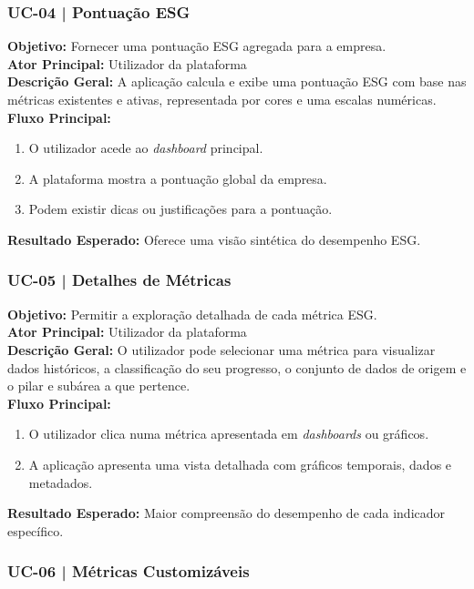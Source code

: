 \subsubsection{UC-04 | Pontuação ESG}

\textbf{Objetivo:} Fornecer uma pontuação ESG agregada para a empresa.\\
\textbf{Ator Principal:} Utilizador da plataforma\\
\textbf{Descrição Geral:} A aplicação calcula e exibe uma pontuação ESG com base nas métricas existentes e ativas, representada por cores e uma escalas numéricas.\\
\textbf{Fluxo Principal:}
\begin{enumerate}
    \item O utilizador acede ao \textit{dashboard} principal.
    \item A plataforma mostra a pontuação global da empresa.
    \item Podem existir dicas ou justificações para a pontuação.
\end{enumerate}
\textbf{Resultado Esperado:} Oferece uma visão sintética do desempenho ESG.

\subsubsection{UC-05 | Detalhes de Métricas}

\textbf{Objetivo:} Permitir a exploração detalhada de cada métrica ESG.\\
\textbf{Ator Principal:} Utilizador da plataforma\\
\textbf{Descrição Geral:} O utilizador pode selecionar uma métrica para visualizar dados históricos, a classificação do seu progresso, o conjunto de dados de origem e o pilar e subárea a que pertence.\\
\textbf{Fluxo Principal:}
\begin{enumerate}
    \item O utilizador clica numa métrica apresentada em \textit{dashboards} ou gráficos.
    \item A aplicação apresenta uma vista detalhada com gráficos temporais, dados e metadados.
\end{enumerate}
\textbf{Resultado Esperado:} Maior compreensão do desempenho de cada indicador específico.

\subsubsection{UC-06 | Métricas Customizáveis}

